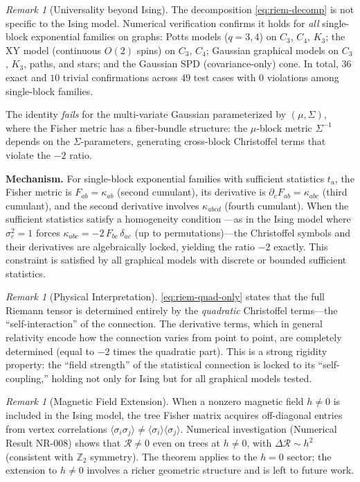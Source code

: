 \documentclass[11pt]{article}
\theoremstyle{definition}
\theoremstyle{remark}
\newtheorem{remark}[theorem]{Remark}
\newcommand{\Scal}{\mathcal{R}}
\begin{document}
\begin{remark}[Universality beyond Ising]
\label{rem:riem-universality}
The decomposition \eqref{eq:riem-decomp} is not specific to the Ising model.
Numerical verification confirms it holds for \emph{all} single-block
exponential families on graphs: Potts models ($q = 3, 4$) on $C_3$, $C_4$,
$K_3$; the XY model (continuous $O(2)$ spins) on $C_3$, $C_4$; Gaussian
graphical models on $C_3$, $K_3$, paths, and stars; and the Gaussian SPD
(covariance-only) cone. In total, $36$ exact and $10$ trivial
confirmations across $49$ test cases with $0$ violations among single-block
families.

The identity \emph{fails} for the multi-variate Gaussian parameterized by
$(\mu, \Sigma)$, where the Fisher metric has a fiber-bundle structure:
the $\mu$-block metric $\Sigma^{-1}$ depends on the $\Sigma$-parameters,
generating cross-block Christoffel terms that violate the $-2$ ratio.

\textbf{Mechanism.} For single-block exponential families with sufficient
statistics $t_a$, the Fisher metric is $F_{ab} = \kappa_{ab}$ (second
cumulant), its derivative is $\partial_c F_{ab} = \kappa_{abc}$ (third
cumulant), and the second derivative involves $\kappa_{abcd}$ (fourth
cumulant). When the sufficient statistics satisfy a homogeneity condition
---as in the Ising model where $\sigma_e^2 = 1$ forces
$\kappa_{abc} = -2\,F_{bc}\,\delta_{ac}$ (up to permutations)---the
Christoffel symbols and their derivatives are algebraically locked, yielding
the ratio $-2$ exactly. This constraint is satisfied by all graphical models
with discrete or bounded sufficient statistics.
\end{remark}

\begin{remark}[Physical Interpretation]
\cref{eq:riem-quad-only} states that the full Riemann tensor is determined
entirely by the \emph{quadratic} Christoffel terms---the ``self-interaction''
of the connection. The derivative terms, which in general relativity encode
how the connection varies from point to point, are completely determined
(equal to $-2$ times the quadratic part). This is a strong rigidity
property: the ``field strength'' of the statistical connection is locked
to its ``self-coupling,'' holding not only for Ising but for all graphical
models tested.
\end{remark}

\begin{remark}[Magnetic Field Extension]
When a nonzero magnetic field $h \neq 0$ is included in the Ising model,
the tree Fisher matrix acquires off-diagonal entries from vertex correlations
$\langle \sigma_i \sigma_j \rangle \neq \langle \sigma_i \rangle
\langle \sigma_j \rangle$. Numerical investigation (Numerical Result NR-008)
shows that $\Scal \neq 0$ even on trees at $h \neq 0$, with
$\Delta\Scal \sim h^2$ (consistent with $\mathbb{Z}_2$ symmetry). The theorem
applies to the $h = 0$ sector; the extension to $h \neq 0$ involves
a richer geometric structure and is left to future work.
\end{remark}
\end{document}
